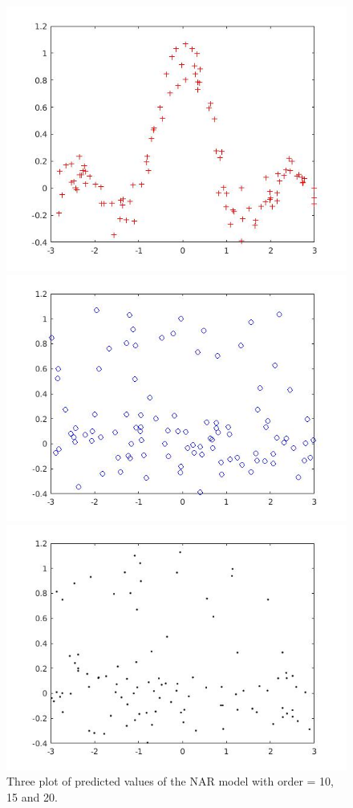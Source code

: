 \documentclass[•]{article}
\begin{document}
\begin{figure}[H]
\centering
\begin{minipage}{.3\textwidth}
\includegraphics[width=.8\textwidth]{inout1.jpg}
\end{minipage}
\begin{minipage}{.3\textwidth}
\includegraphics[width=.8\textwidth]{inout2.jpg}
\end{minipage}
\begin{minipage}{.3\textwidth}
\includegraphics[width=.8\textwidth]{inout3.jpg}
\end{minipage}
\caption{Three plot of predicted values of the NAR model with order = 10, 15 and 20.}
\end{figure}
\end{document}
